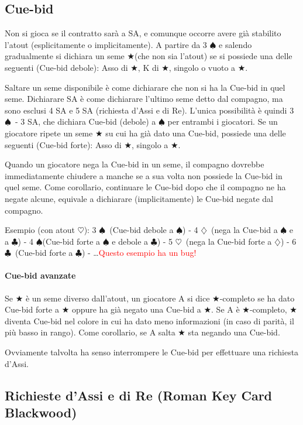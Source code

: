 \documentclass[a4paper,10pt]{article}
\renewcommand{\c}{$\clubsuit$\xspace}
\renewcommand{\d}{$\diamondsuit$\xspace}
\newcommand{\h}{$\heartsuit$\xspace}
\newcommand{\s}{$\spadesuit$\xspace}
\renewcommand{\j}{$\bigstar$\xspace}
\newcommand{\note}[1]{\textcolor{red}{#1}}
\begin{document}
\subsection{Cue-bid}

Non si gioca se il contratto sarà a SA, e comunque occorre avere già stabilito l'atout (esplicitamente o implicitamente). A partire da 3 \s e salendo gradualmente si dichiara un seme \j (che non sia l'atout) se si possiede una delle seguenti (Cue-bid debole): Asso di \j, K di \j, singolo o vuoto a \j.

Saltare un seme disponibile è come dichiarare che non si ha la Cue-bid in quel seme. Dichiarare SA è come dichiarare l'ultimo seme detto dal compagno, ma sono esclusi 4 SA e 5 SA (richiesta d'Assi e di Re). L'unica possibilità è quindi 3 \s\ - 3 SA, che dichiara Cue-bid (debole) a \s per entrambi i giocatori. Se un giocatore ripete un seme \j su cui ha già dato una Cue-bid, possiede una delle seguenti (Cue-bid forte): Asso di \j, singolo a \j.

Quando un giocatore nega la Cue-bid in un seme, il compagno dovrebbe immediatamente chiudere a manche se a sua volta non possiede la Cue-bid in quel seme.
Come corollario, continuare le Cue-bid dopo che il compagno ne ha negate alcune, equivale a dichiarare (implicitamente) le Cue-bid negate dal compagno.

Esempio (con atout \h): 3 \s\  (Cue-bid debole a \s) - 4 \d\ (nega la Cue-bid a \s e a \c) - 4 \s (Cue-bid forte a \s e debole a \c) - 5 \h\ (nega la Cue-bid forte a \d) - 6 \c\ (Cue-bid forte a \c) - \dots \note{Questo esempio ha un bug!}

\paragraph{Cue-bid avanzate} Se \j è un seme diverso dall'atout, un giocatore A si dice \j-completo se ha dato Cue-bid forte a \j oppure ha già negato una Cue-bid a \j. Se A è \j-completo, \j diventa Cue-bid nel colore in cui ha dato meno informazioni (in caso di parità, il più basso in rango). Come corollario, se A salta \j sta negando una Cue-bid.
\vspace{4mm}

Ovviamente talvolta ha senso interrompere le Cue-bid per effettuare una richiesta d'Assi.


\subsection{Richieste d'Assi e di Re (Roman Key Card Blackwood)}
\end{document}
